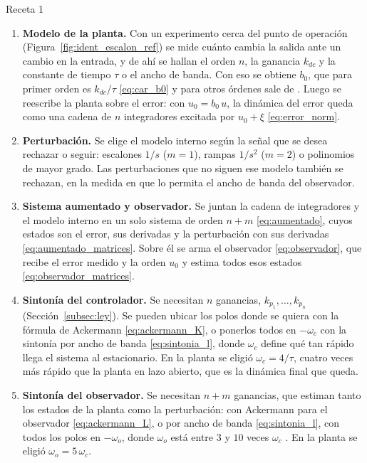 \begin{recuadro}{Receta 1}
\begin{enumerate}\setlength{\itemsep}{2pt}
  \item \textbf{Modelo de la planta.} Con un experimento cerca del punto de operación
  (Figura~\ref{fig:ident_escalon_ref}) se mide cuánto cambia la salida ante un cambio en la entrada, y
  de ahí se hallan el orden $n$, la ganancia $k_{dc}$ y la constante de tiempo $\tau$ o el ancho de
  banda. Con eso se obtiene $b_0$, que para primer orden es $k_{dc}/\tau$ \eqref{eq:car_b0} y para
  otros órdenes sale de \cite[tabla~3.1]{herbst2024adrc}. Luego se reescribe la planta sobre el error:
  con $u_0 = b_0\,u$, la dinámica del error queda como una cadena de $n$ integradores excitada por
  $u_0 + \xi$ \eqref{eq:error_norm}.
  \item \textbf{Perturbación.} Se elige el modelo interno según la señal que se desea rechazar o seguir:
  escalones $1/s$ ($m = 1$), rampas $1/s^2$ ($m = 2$) o polinomios de mayor grado. Las perturbaciones
  que no siguen ese modelo también se rechazan, en la medida en que lo permita el ancho de banda del
  observador.
  \item \textbf{Sistema aumentado y observador.} Se juntan la cadena de integradores y el modelo
  interno en un solo sistema de orden $n + m$ \eqref{eq:aumentado}, cuyos estados son el error, sus
  derivadas y la perturbación con sus derivadas \eqref{eq:aumentado_matrices}. Sobre él se arma el
  observador \eqref{eq:observador}, que recibe el error medido y la orden $u_0$ y estima todos esos
  estados \eqref{eq:observador_matrices}.
  \item \textbf{Sintonía del controlador.} Se necesitan $n$ ganancias, $k_{p_1}, \dots, k_{p_n}$
  (Sección~\ref{subsec:ley}). Se pueden ubicar los polos donde se quiera con la fórmula de Ackermann
  \eqref{eq:ackermann_K}, o ponerlos todos en $-\omega_c$ con la sintonía por ancho de banda
  \eqref{eq:sintonia_l}, donde $\omega_c$ define qué tan rápido llega el sistema al estacionario. En
  la planta se eligió $\omega_c = 4/\tau$, cuatro veces más rápido que la planta en lazo abierto, que
  es la dinámica final que queda.
  \item \textbf{Sintonía del observador.} Se necesitan $n + m$ ganancias, que estiman tanto los
  estados de la planta como la perturbación: con Ackermann para el observador \eqref{eq:ackermann_L},
  o por ancho de banda \eqref{eq:sintonia_l}, con todos los polos en $-\omega_o$, donde $\omega_o$
  está entre $3$ y $10$ veces $\omega_c$ \cite[sec.~3.3]{herbst2024adrc}. En la planta se eligió
  $\omega_o = 5\,\omega_c$.
\end{enumerate}
\end{recuadro}

